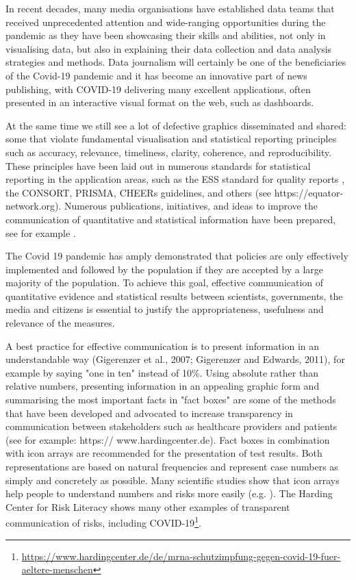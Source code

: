 \documentclass[article]{jdssv}\usepackage[]{graphicx}\usepackage[]{color}
\begin{document}
In recent decades, many media organisations have established data teams that received unprecedented attention and wide-ranging opportunities during the pandemic as they have been showcasing their skills and abilities, not only in visualising data, but also in explaining their data collection and data analysis strategies and methods. Data journalism will certainly be one of the beneficiaries of the Covid-19 pandemic and it has become an innovative part of news publishing, with COVID-19 delivering many excellent applications, often presented in an interactive visual format on the web, such as dashboards.


At the same time we still see a lot of defective graphics disseminated and shared: some that violate fundamental visualisation and statistical reporting principles such as accuracy, relevance, timeliness, clarity, coherence, and reproducibility. These principles have been laid out in numerous standards for statistical reporting in the application areas, such as the ESS standard for quality reports \citep{ess2009}, the CONSORT, PRISMA, CHEERs guidelines, and others (see https://equator-network.org). Numerous publications, initiatives, and ideas to improve the communication of quantitative and statistical information have been prepared, see for example \cite{Hoffrage2261,Tufte2001,Rosling2011,otavamylona2020}.

The Covid 19 pandemic has amply demonstrated that policies are only effectively implemented and followed by the population if they are accepted by a large majority of the population. To achieve this goal, effective communication of quantitative evidence and statistical results between scientists, governments, the media and citizens is essential to justify the appropriateness, usefulness and relevance of the measures. 

A best practice for effective communication is to present information in an understandable way (Gigerenzer et al., 2007; Gigerenzer and Edwards, 2011), for example by saying "one in ten" instead of 10\%. Using absolute rather than relative numbers, presenting information in an appealing graphic form and summarising the most important facts in "fact boxes" are some of the methods that have been developed and advocated to increase transparency in communication between stakeholders such as healthcare providers and patients (see for example: https:// www.hardingcenter.de).
Fact boxes in combination with icon arrays are recommended for the presentation of test results. Both representations are based on natural frequencies \citep{[62],Krauss2020} and represent case numbers as simply and concretely as possible. Many scientific studies show that icon arrays help people to understand numbers and risks more easily (e.g. \cite{McDowell2019}). The Harding Center for Risk Literacy shows many other examples of transparent communication of risks, including COVID-19\footnote{\url{https://www.hardingcenter.de/de/mrna-schutzimpfung-gegen-covid-19-fuer-aeltere-menschen}}.
\end{document}
